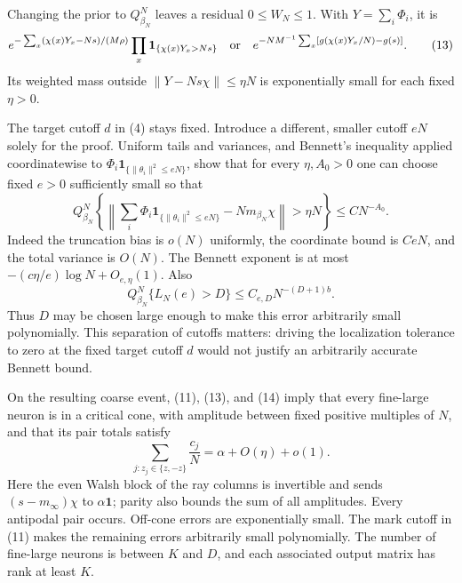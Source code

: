 \documentclass[11pt]{article}
\newcommand{\one}{\mathbf1}
\begin{document}
Changing the prior to $Q_{\beta_N}^N$ leaves a residual $0\le W_N\le1$.
With $Y=\sum_i\Phi_i$, it is
\[
 e^{-\sum_x(\chi(x)Y_x-Ns)/(M\rho)}\prod_x\one_{\{\chi(x)Y_x>Ns\}}
 \quad\hbox{or}\quad
 e^{-N M^{-1}\sum_x[g(\chi(x)Y_x/N)-g(s)]}.            \tag{13}
\]
Its weighted mass outside $\|Y-Ns\chi\|\le\eta N$ is exponentially
small for each fixed $\eta>0$.

The target cutoff $d$ in (4) stays fixed. Introduce a different,
smaller cutoff $eN$ solely for the proof. Uniform tails and variances,
and Bennett's inequality applied coordinatewise to
$\Phi_i\one_{\{\|\theta_i\|^2\le eN\}}$, show that for every
$\eta,A_0>0$ one can choose fixed $e>0$ sufficiently small so that
\[
 Q_{\beta_N}^N\left\{
 \left\|\sum_i\Phi_i\one_{\{\|\theta_i\|^2\le eN\}}
            -Nm_{\beta_N}\chi\right\|>\eta N\right\}
                                         \le C N^{-A_0}. \tag{14}
\]
Indeed the truncation bias is $o(N)$ uniformly, the coordinate bound
is $CeN$, and the total variance is $O(N)$. The Bennett exponent is
at most $-(c\eta/e)\log N+O_{e,\eta}(1)$.
Also
\[
             Q_{\beta_N}^N\{L_N(e)>D\}
                             \le C_{e,D}N^{-(D+1)b}.    \tag{15}
\]
Thus $D$ may be chosen large enough to make this error arbitrarily
small polynomially. This separation of cutoffs matters: driving the
localization tolerance to zero at the fixed target cutoff $d$ would
not justify an arbitrarily accurate Bennett bound.

On the resulting coarse event, (11), (13), and (14) imply that every
fine-large neuron is in a critical cone, with amplitude between fixed
positive multiples of $N$, and that its pair totals satisfy
\[
       \sum_{j:z_j\in\{z,-z\}}\frac{c_j}{N}
                            =\alpha+O(\eta)+o(1).       \tag{16}
\]
Here the even Walsh block of the ray columns is invertible and sends
$(s-m_\infty)\chi$ to $\alpha\one$; parity also bounds the sum of all
amplitudes. Every antipodal pair occurs. Off-cone errors are exponentially
small. The mark cutoff in (11) makes the remaining errors arbitrarily
small polynomially. The number of fine-large neurons is between $K$
and $D$, and each associated output matrix has rank at least $K$.
\end{document}
